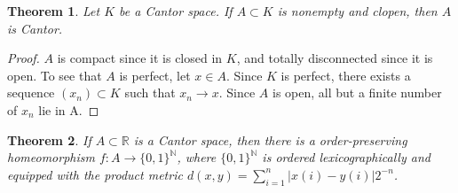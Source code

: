 \documentclass{article}
\newtheorem{theorem}{Theorem}
\newcommand{\N}{\mathbb{N}}
\begin{document}

\begin{theorem}\label{subc}
Let $K$ be a Cantor space. If $A \subset K$ is nonempty and clopen, then $A$ is Cantor.
\end{theorem}
\begin{proof}
$A$ is compact since it is closed in $K$, and totally disconnected since it is open. 
To see that $A$ is perfect, let $x \in A$. Since $K$ is perfect, there exists a sequence $\left(x_n\right) \subset K$ such that $x_n \rightarrow x$.
Since $A$ is open, all but a finite number of $x_n$ lie in A.
\end{proof}

\begin{theorem}\label{hom}
If $A \subset \mathbb{R}$ is a Cantor space, then there is a order-preserving homeomorphism $f:A \rightarrow {\{0,1\}}^\mathbb{N}$, where $\{0,1\}^\N$ is ordered lexicographically and equipped with the product metric $d(x,y) = \sum_{i=1}^n |x(i) - y(i)| 2^{-n}$.
\end{theorem}
\end{document}
